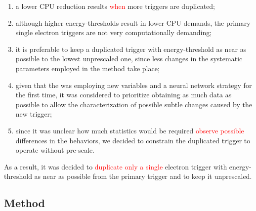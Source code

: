 \begin{enumerate}
  \item a lower CPU reduction results \textcolor{red}{when} more triggers are duplicated;
  \item although higher energy-thresholds result in lower CPU demands, the
    primary single electron triggers are not very computationally demanding;
  \item it is preferable to keep a duplicated trigger with energy-threshold as
    near as possible to the lowest unprescaled one, since less changes in the
    systematic parameters employed in the \Zee{} \tnp{} method take place;
  \item given that the \rnn{} was employing new variables and a neural network
    strategy for the first time, it was considered to prioritize obtaining as
    much data as possible to allow the characterization of possible subtle
    changes caused by the new trigger;
  \item since it was unclear how much statistics would be required \textcolor{red}{observe possible} differences in the behaviors, we decided to constrain the
    duplicated trigger to operate without pre-scale.
\end{enumerate}

As a result, it was decided to \textcolor{red}{duplicate only a single} electron trigger with energy-threshold as near as possible from the primary trigger and to keep it unprescaled.


\subsection{Method}\label{top:homogeneity_method}



